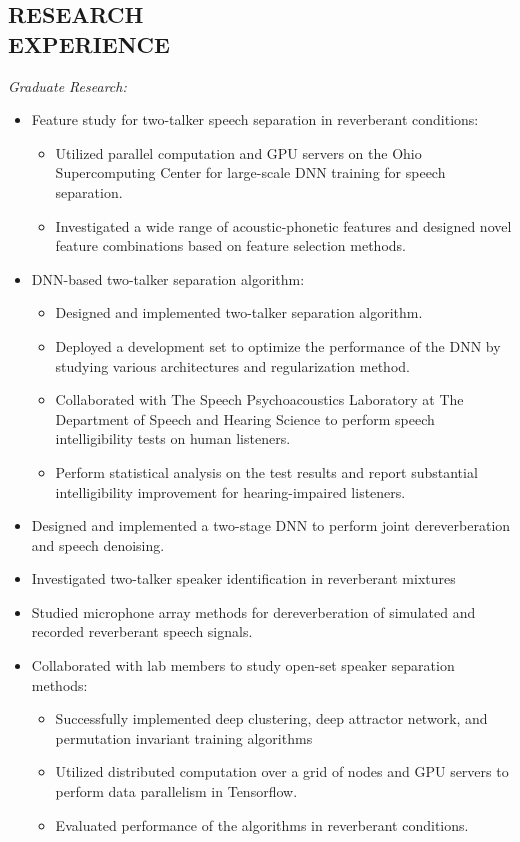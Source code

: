 \documentclass[margin, 10pt]{res}
\begin{document}
\begin{resume}
\section{RESEARCH \\ EXPERIENCE}
\textit{Graduate Research:}
\begin{itemize}
\item Feature study for two-talker speech separation in reverberant conditions:
	\begin{itemize}
	\item Utilized parallel computation and GPU servers on the Ohio Supercomputing Center for large-scale DNN training for speech separation.
	\item Investigated a wide range of acoustic-phonetic features and designed novel feature combinations based on feature selection methods.
	\end{itemize}

\item DNN-based two-talker separation algorithm:
	\begin{itemize}
	\item Designed and implemented two-talker separation algorithm.
	\item Deployed a development set to optimize the performance of the DNN by studying various architectures and regularization method.
	\item Collaborated with The Speech Psychoacoustics Laboratory at The Department of Speech and Hearing Science to perform speech intelligibility tests on human listeners.
	\item Perform statistical analysis on the test results and report substantial intelligibility improvement for hearing-impaired listeners.
	\end{itemize}

\item Designed and implemented a two-stage DNN to perform joint dereverberation and speech denoising.
\item Investigated two-talker speaker identification in reverberant mixtures
\item Studied microphone array methods for dereverberation of simulated and recorded reverberant speech signals.

\item Collaborated with lab members to study open-set speaker separation methods:
	\begin{itemize}
	\item Successfully implemented deep clustering, deep attractor network, and permutation invariant training algorithms
	\item Utilized distributed computation over a grid of nodes and GPU servers to perform data parallelism in Tensorflow.
	\item Evaluated performance of the algorithms in reverberant conditions.
	\end{itemize}


\end{itemize}
\end{resume}
\end{document}
